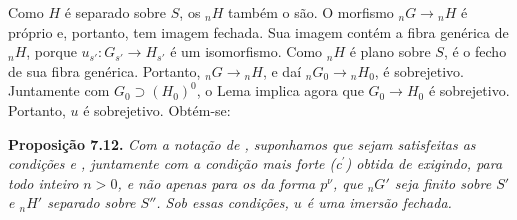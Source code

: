 Como \(H\) é separado sobre \(S\), os \({}_nH\) também o são. O
morfismo \({}_nG\to{}_nH\) é próprio e, portanto, tem imagem fechada. Sua
imagem contém a fibra genérica de \({}_nH\), porque
\(u_{s'}:G_{s'}\to H_{s'}\) é um isomorfismo. Como \({}_nH\) é plano
sobre \(S\), é o fecho de sua fibra genérica. Portanto,
\({}_nG\to{}_nH\), e daí \({}_nG_0\to{}_nH_0\), é sobrejetivo. Juntamente
com \(G_0\supset(H_0)^0\), o Lema
 implica agora que \(G_0\to H_0\) é
sobrejetivo. Portanto, \(u\) é sobrejetivo. Obtém-se:

\medskip
\noindent{}\textbf{Proposição 7.12.}
\textit{Com a notação de ,
suponhamos que sejam satisfeitas as condições
 e
, juntamente com a condição
mais forte (c\(^{\prime}\)) obtida de
 exigindo, para todo
inteiro \(n>0\), e não apenas para os da forma \(p^\nu\), que \({}_nG'\)
seja finito sobre \(S'\) e \({}_nH'\) separado sobre \(S''\). Sob essas condições, \(u\)
é uma imersão fechada.}

